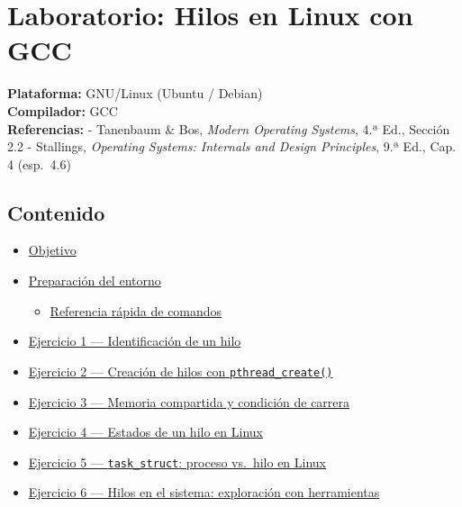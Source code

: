 \documentclass[
  spanish,
]{article}
\author{}
\date{}
\providecommand{\tightlist}{%
  \setlength{\itemsep}{0pt}\setlength{\parskip}{0pt}}
\begin{document}
{
\setcounter{tocdepth}{3}
\tableofcontents
}
\section{Laboratorio: Hilos en Linux con
GCC}\label{laboratorio-hilos-en-linux-con-gcc}

\textbf{Plataforma:} GNU/Linux (Ubuntu / Debian)\\
\textbf{Compilador:} GCC\\
\textbf{Referencias:} - Tanenbaum \& Bos, \emph{Modern Operating
Systems}, 4.ª Ed., Sección 2.2 - Stallings, \emph{Operating Systems:
Internals and Design Principles}, 9.ª Ed., Cap. 4 (esp.~4.6)

\subsection{Contenido}\label{contenido}

\begin{itemize}
\tightlist
\item
  \hyperref[objetivo]{Objetivo}
\item
  \hyperref[preparaciuxf3n-del-entorno]{Preparación del entorno}

  \begin{itemize}
  \tightlist
  \item
    \hyperref[referencia-ruxe1pida-de-comandos]{Referencia rápida de
    comandos}
  \end{itemize}
\item
  \hyperref[ejercicio-1--identificaciuxf3n-de-un-hilo]{Ejercicio 1 ---
  Identificación de un hilo}
\item
  \hyperref[ejercicio-2--creaciuxf3n-de-hilos-con-pthread_create]{Ejercicio
  2 --- Creación de hilos con \texttt{pthread\_create()}}
\item
  \hyperref[ejercicio-3--memoria-compartida-y-condiciuxf3n-de-carrera]{Ejercicio
  3 --- Memoria compartida y condición de carrera}
\item
  \hyperref[ejercicio-4--estados-de-un-hilo-en-linux]{Ejercicio 4 ---
  Estados de un hilo en Linux}
\item
  \hyperref[ejercicio-5--task_struct-proceso-vs-hilo-en-linux]{Ejercicio
  5 --- \texttt{task\_struct}: proceso vs.~hilo en Linux}
\item
  \hyperref[ejercicio-6--hilos-en-el-sistema-exploraciuxf3n-con-herramientas]{Ejercicio
  6 --- Hilos en el sistema: exploración con herramientas}
\end{itemize}
\end{document}
